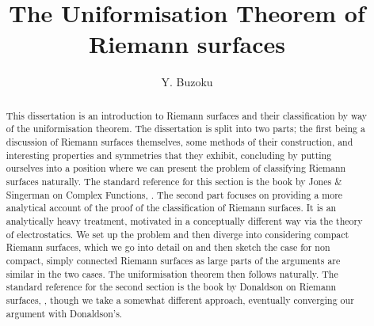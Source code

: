 \documentclass[11pt]{report}
\title{The Uniformisation Theorem of Riemann surfaces}
\author{Y. Buzoku}
\theoremstyle{definition}
\begin{document}
\maketitle
\setcounter{tocdepth}{1}  %
\tableofcontents

\newpage
\begin{abstract}
This dissertation is an introduction to Riemann surfaces and their classification by way of the uniformisation theorem. The dissertation is split into two parts; the first being a discussion of Riemann surfaces themselves, some methods of their construction, and interesting properties and symmetries that they exhibit, concluding by putting ourselves into a position where we can present the problem of classifying Riemann surfaces naturally. The standard reference for this section is the book by Jones \& Singerman on Complex Functions, \cite{comfun}. The second part focuses on providing a more analytical account of the proof of the classification of Riemann surfaces. It is an analytically heavy treatment, motivated in a conceptually different way via the theory of electrostatics. We set up the problem and then diverge into considering compact Riemann surfaces, which we go into detail on and then sketch the case for non compact, simply connected Riemann surfaces as large parts of the arguments are similar in the two cases. The uniformisation theorem then follows naturally. The standard reference for the second section is the book by Donaldson on Riemann surfaces, \cite{donaldson}, though we take a somewhat different approach, eventually converging our argument with Donaldson's.
\end{abstract}
\declaration %
\end{document}

